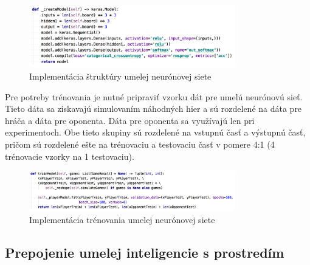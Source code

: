\begin{figure}[H]
    \centering
    \includegraphics[width=0.8\textwidth]{images/impl-ann-model.jpg}
    \caption{Implementácia štruktúry umelej neurónovej siete}
\end{figure}\label{figure:ann-model-impl}

Pre potreby trénovania je nutné pripraviť vzorku dát pre umelú neurónovú sieť.
Tieto dáta sa získavajú simulovaním náhodných hier a sú rozdelené na dáta pre hráča a dáta pre oponenta.
Dáta pre oponenta sa využívajú len pri experimentoch.
Obe tieto skupiny sú rozdelené na vstupnú časť a výstupnú časť, pričom sú rozdelené ešte na trénovaciu a testovaciu časť
v pomere 4:1 (4 trénovacie vzorky na 1 testovaciu).

\begin{figure}[H]
    \centering
    \includegraphics[width=0.8\textwidth]{images/impl-ann-train.jpg}
    \caption{Implementácia trénovania umelej neurónovej siete}
\end{figure}\label{figure:ann-train-impl}

\subsection{Prepojenie umelej inteligencie s prostredím}\label{subsec:connection}

